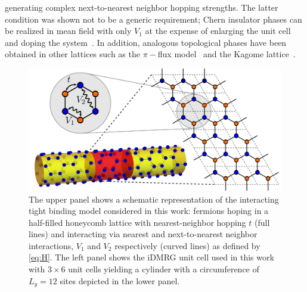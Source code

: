 \documentclass[aps,prx,10pt,twocolumn,floatfix,superscriptaddress,showpacs,numerical,footinbib]{revtex4-1}
\begin{document}
generating complex next-to-nearest neighbor hopping strengths.
%
The latter condition was shown not to be a generic requirement; Chern insulator phases can be realized 
in mean field with only $V_{1}$ at the expense of enlarging the unit cell and doping the system~\cite{CGV11,GCC13}.
%
In addition, analogous topological phases have been obtained in other lattices such as the $\pi-$flux model~\cite{WF10,JGC13} and the Kagome lattice~\cite{WRW10}.
%
\begin{figure}
%
 \includegraphics[width=\columnwidth]{pdf/unit_cell.pdf}
 \caption{The upper panel shows a schematic representation of the interacting tight binding model considered in this work:
fermions hoping in a half-filled honeycomb lattice with nearest-neighbor hopping $t$ (full lines) and interacting via
 nearest and next-to-nearest neighbor interactions, $V_{1}$ and $V_{2}$ respectively (curved lines) as defined by 
 \eqref{eq:H}.
 The left panel shows the iDMRG unit cell used in this work with 
 $3 \times 6$ unit cells yielding a cylinder with a circumference of $L_{y}=12$ sites depicted in the lower panel. 
 \label{fig:Defs}}
\end{figure}
\\
\end{document}
